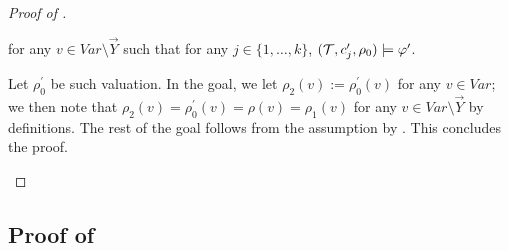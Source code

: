 \begin{proof}[Proof of ]
\begin{enumerate}
\begin{proofenv}
        for any $v \in \mathit{Var} \setminus \vec{Y}$ such that for any $j \in \{ 1, \ldots, k \}$,
        $(\mathcal{T}, c^\prime_j, \rho_0) \models \varphi^\prime$.
    \end{proofenv}
    Let $\rho_0^\prime$ be such valuation.
    In the goal, we let $\rho_2(v) := \rho_0^\prime(v)$ for any $v \in \mathit{Var}$;
    we then note that $\rho_2(v) = \rho_0^\prime(v) =  \rho(v) =  \rho_1(v)$ for any $v \in \mathit{Var} \setminus \vec{Y}$ by definitions.
    The rest of the goal follows from the assumption by .
    This concludes the proof.
\end{enumerate}
\end{proof}

\subsection{Proof of~}\label{app:crlsoundness}

